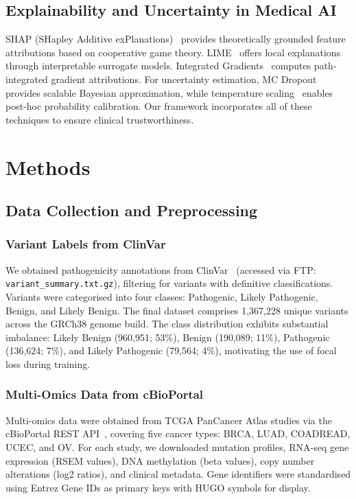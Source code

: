 \documentclass[journal,twoside]{IEEEtran}
\begin{document}
\subsection{Explainability and Uncertainty in Medical AI}

SHAP (SHapley Additive exPlanations)~\cite{lundberg2017shap} provides
theoretically grounded feature attributions based on cooperative game theory.
LIME~\cite{ribeiro2016lime} offers local explanations through interpretable
surrogate models. Integrated Gradients~\cite{sundararajan2017ig} computes
path-integrated gradient attributions. For uncertainty estimation, MC
Dropout~\cite{gal2016mcdropout} provides scalable Bayesian approximation,
while temperature scaling~\cite{guo2017calibration} enables post-hoc
probability calibration. Our framework incorporates all of these techniques
to ensure clinical trustworthiness.

\section{Methods}

\subsection{Data Collection and Preprocessing}

\subsubsection{Variant Labels from ClinVar}
We obtained pathogenicity annotations from ClinVar~\cite{landrum2020clinvar}
(accessed via FTP: \texttt{variant\_summary.txt.gz}), filtering for variants
with definitive classifications. Variants were categorised into four classes:
Pathogenic, Likely Pathogenic, Benign, and Likely Benign. The final dataset
comprises 1,367,228 unique variants across the GRCh38 genome build. The class
distribution exhibits substantial imbalance: Likely Benign (960,951; 53\%),
Benign (190,089; 11\%), Pathogenic (136,624; 7\%), and Likely Pathogenic
(79,564; 4\%), motivating the use of focal loss during training.

\subsubsection{Multi-Omics Data from cBioPortal}
Multi-omics data were obtained from TCGA PanCancer Atlas studies via the
cBioPortal REST API~\cite{cerami2012cbio, gao2013cbio}, covering five cancer
types: BRCA, LUAD, COADREAD, UCEC, and OV. For each study, we downloaded
mutation profiles, RNA-seq gene expression (RSEM values), DNA methylation
(beta values), copy number alterations (log2 ratios), and clinical metadata.
Gene identifiers were standardised using Entrez Gene IDs as primary keys with
HUGO symbols for display.
\end{document}
